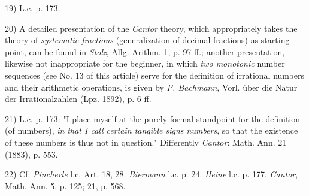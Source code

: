 \vspace{-0.1cm}
\leftline{\rule{2in}{0.4pt}}
\vspace{0.1cm}
{
\footnotesize
19) L.c. p. 173.

20) A detailed presentation of the \textit{Cantor} theory, which appropriately takes the theory of \textit{systematic fractions} (generalization of decimal fractions) as starting point, can be found in \textit{Stolz}, Allg. Arithm. 1, p. 97 ff.; another presentation, likewise not inappropriate for the beginner, in which \textit{two monotonic} number sequences (see No. 13 of this article) serve for the definition of irrational numbers and their arithmetic operations, is given by \textit{P. Bachmann}, Vorl. über die Natur der Irrationalzahlen (Lpz. 1892), p. 6 ff.

21) L.c. p. 173: "I place myself at the purely formal standpoint for the definition (of numbers), \textit{in that I call certain tangible signs numbers}, so that the existence of these numbers is thus not in question." Differently \textit{Cantor}: Math. Ann. 21 (1883), p. 553.

22) Cf. \textit{Pincherle} l.c. Art. 18, 28. \textit{Biermann} l.c. p. 24. \textit{Heine} l.c. p. 177. \textit{Cantor}, Math. Ann. 5, p. 125; 21, p. 568.

}
